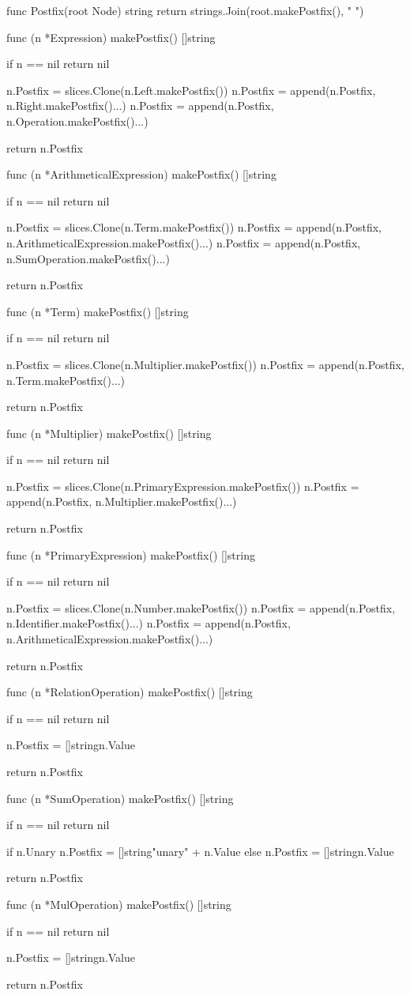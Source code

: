 func Postfix(root Node) string {
	return strings.Join(root.makePostfix(), " ")
}

func (n *Expression) makePostfix() []string {
	if n == nil {
		return nil
	}

	n.Postfix = slices.Clone(n.Left.makePostfix())
	n.Postfix = append(n.Postfix, n.Right.makePostfix()...)
	n.Postfix = append(n.Postfix, n.Operation.makePostfix()...)

	return n.Postfix
}

func (n *ArithmeticalExpression) makePostfix() []string {
	if n == nil {
		return nil
	}

	n.Postfix = slices.Clone(n.Term.makePostfix())
	n.Postfix = append(n.Postfix, n.ArithmeticalExpression.makePostfix()...)
	n.Postfix = append(n.Postfix, n.SumOperation.makePostfix()...)

	return n.Postfix
}

func (n *Term) makePostfix() []string {
	if n == nil {
		return nil
	}

	n.Postfix = slices.Clone(n.Multiplier.makePostfix())
	n.Postfix = append(n.Postfix, n.Term.makePostfix()...)

	return n.Postfix
}

func (n *Multiplier) makePostfix() []string {
	if n == nil {
		return nil
	}

	n.Postfix = slices.Clone(n.PrimaryExpression.makePostfix())
	n.Postfix = append(n.Postfix, n.Multiplier.makePostfix()...)

	return n.Postfix
}

func (n *PrimaryExpression) makePostfix() []string {
	if n == nil {
		return nil
	}

	n.Postfix = slices.Clone(n.Number.makePostfix())
	n.Postfix = append(n.Postfix, n.Identifier.makePostfix()...)
	n.Postfix = append(n.Postfix, n.ArithmeticalExpression.makePostfix()...)

	return n.Postfix
}

func (n *RelationOperation) makePostfix() []string {
	if n == nil {
		return nil
	}

	n.Postfix = []string{n.Value}

	return n.Postfix
}

func (n *SumOperation) makePostfix() []string {
	if n == nil {
		return nil
	}

	if n.Unary {
		n.Postfix = []string{"unary" + n.Value}
	} else {
		n.Postfix = []string{n.Value}
	}

	return n.Postfix
}

func (n *MulOperation) makePostfix() []string {
	if n == nil {
		return nil
	}

	n.Postfix = []string{n.Value}

	return n.Postfix
}

